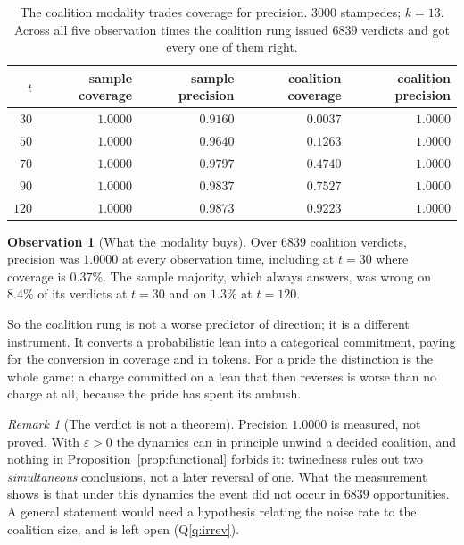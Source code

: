 \documentclass[11pt,a4paper]{article}
\theoremstyle{plain}
\theoremstyle{definition}
\newtheorem{observation}[theorem]{Observation}
\theoremstyle{remark}
\newtheorem{remark}[theorem]{Remark}
\begin{document}
\begin{table}[t]
\centering
\begin{tabular}{@{}rrrrr@{}}
\toprule
$t$ & sample coverage & sample precision & coalition coverage & coalition precision\\
\midrule
$30$  & $1.0000$ & $0.9160$ & $0.0037$ & $1.0000$\\
$50$  & $1.0000$ & $0.9640$ & $0.1263$ & $1.0000$\\
$70$  & $1.0000$ & $0.9797$ & $0.4740$ & $1.0000$\\
$90$  & $1.0000$ & $0.9837$ & $0.7527$ & $1.0000$\\
$120$ & $1.0000$ & $0.9873$ & $0.9223$ & $1.0000$\\
\bottomrule
\end{tabular}
\caption{The coalition modality trades coverage for precision. $3000$
stampedes; $k = 13$. Across all five observation times the coalition rung
issued $6839$ verdicts and got every one of them right.}
\label{tab:lean}
\end{table}

\begin{observation}[What the modality buys]\label{obs:irrev}
Over $6839$ coalition verdicts, precision was $1.0000$ at every observation
time, including at $t = 30$ where coverage is $0.37\%$. The sample majority,
which always answers, was wrong on $8.4\%$ of its verdicts at $t=30$ and on
$1.3\%$ at $t = 120$.
\end{observation}

So the coalition rung is not a worse predictor of direction; it is a different
instrument. It converts a probabilistic lean into a categorical commitment,
paying for the conversion in coverage and in tokens. For a pride the
distinction is the whole game: a charge committed on a lean that then reverses
is worse than no charge at all, because the pride has spent its ambush.

\begin{remark}[The verdict is not a theorem]
Precision $1.0000$ is measured, not proved. With $\varepsilon > 0$ the dynamics
can in principle unwind a decided coalition, and nothing in
Proposition~\ref{prop:functional} forbids it: twinedness rules out two
\emph{simultaneous} conclusions, not a later reversal of one. What the
measurement shows is that under this dynamics the event did not occur in $6839$
opportunities. A general statement would need a hypothesis relating the noise
rate to the coalition size, and is left open (Q\ref{q:irrev}).
\end{remark}
\end{document}
